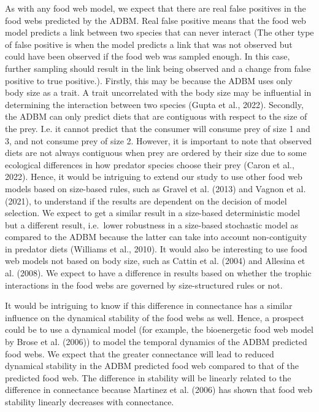\documentclass{article}
\begin{document}
As with any food web model, we expect that there are real false
positives in the food webs predicted by the ADBM. Real false positive
means that the food web model predicts a link between two species that
can never interact (The other type of false positive is when the model
predicts a link that was not observed but could have been observed if
the food web was sampled enough. In this case, further sampling should
result in the link being observed and a change from false positive to
true positive.). Firstly, this may be because the ADBM uses only body
size as a trait. A trait uncorrelated with the body size may be
influential in determining the interaction between two species (Gupta et
al., 2022). Secondly, the ADBM can only predict diets that are
contiguous with respect to the size of the prey. I.e. it cannot predict
that the consumer will consume prey of size 1 and 3, and not consume
prey of size 2. However, it is important to note that observed diets are
not always contiguous when prey are ordered by their size due to some
ecological differences in how predator species choose their prey (Caron
et al., 2022). Hence, it would be intriguing to extend our study to use
other food web models based on size-based rules, such as Gravel et al.
(2013) and Vagnon et al. (2021), to understand if the results are
dependent on the decision of model selection. We expect to get a similar
result in a size-based deterministic model but a different result,
i.e.~lower robustness in a size-based stochastic model as compared to
the ADBM because the latter can take into account non-contiguity in
predator diets (Williams et al., 2010). It would also be interesting to
use food web models not based on body size, such as Cattin et al. (2004)
and Allesina et al. (2008). We expect to have a difference in results
based on whether the trophic interactions in the food webs are governed
by size-structured rules or not.

It would be intriguing to know if this difference in connectance has a
similar influence on the dynamical stability of the food webs as well.
Hence, a prospect could be to use a dynamical model (for example, the
bioenergetic food web model by Brose et al. (2006)) to model the
temporal dynamics of the ADBM predicted food webs. We expect that the
greater connectance will lead to reduced dynamical stability in the ADBM
predicted food web compared to that of the predicted food web. The
difference in stability will be linearly related to the difference in
connectance because Martinez et al. (2006) has shown that food web
stability linearly decreases with connectance.
\end{document}
